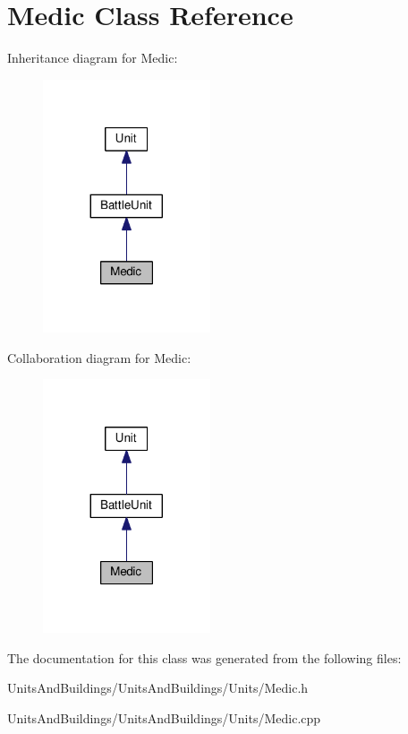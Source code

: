 \hypertarget{class_medic}{}\section{Medic Class Reference}
\label{class_medic}


Inheritance diagram for Medic\+:
\nopagebreak
\begin{figure}[H]
\begin{center}
\leavevmode
\includegraphics[width=140pt]{class_medic__inherit__graph}
\end{center}
\end{figure}


Collaboration diagram for Medic\+:
\nopagebreak
\begin{figure}[H]
\begin{center}
\leavevmode
\includegraphics[width=140pt]{class_medic__coll__graph}
\end{center}
\end{figure}


The documentation for this class was generated from the following files\+:\begin{DoxyCompactItemize}
\item 
Units\+And\+Buildings/\+Units\+And\+Buildings/\+Units/Medic.\+h\item 
Units\+And\+Buildings/\+Units\+And\+Buildings/\+Units/Medic.\+cpp\end{DoxyCompactItemize}
